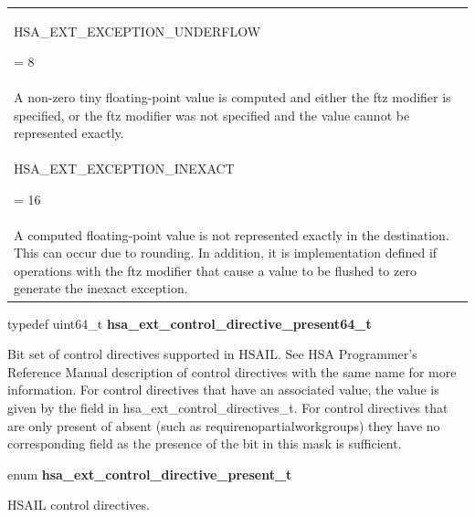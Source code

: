 \documentclass[final]{book}
\newcommand{\reftyp}[1]{#1}
\newcommand{\refenu}[1]{\reftyp{#1}}
\begin{document}
\begin{longtable}{@{\hspace{2em}}p{\linewidth-2em}}
\hspace{-2em}\hypertarget{group__FinalizerCoreApi_1ggaac4b20de831dd17c83c1e2110bac0ef2a15e11888d04953c37f86c8870807c888}{\refenu{HSA_EXT_EXCEPTION_UNDERFLOW}} = 8\\A non-zero tiny floating-point value is computed and either the ftz modifier is specified, or the ftz modifier was not specified and the value cannot be represented exactly.\\[2mm]
\hspace{-2em}\hypertarget{group__FinalizerCoreApi_1ggaac4b20de831dd17c83c1e2110bac0ef2ab0a718c671deb5e84e350199db22a24b}{\refenu{HSA_EXT_EXCEPTION_INEXACT}} = 16\\A computed floating-point value is not represented exactly in the destination. This can occur due to rounding. In addition, it is implementation defined if operations with the ftz modifier that cause a value to be flushed to zero generate the inexact exception.
\end{longtable}

\noindent\begin{tcolorbox}[nobeforeafter,arc=0mm,colframe=white,colback=lightgray,left=0mm]
typedef uint64_t  \hypertarget{group__FinalizerCoreApi_1ga366dea916dc7cec2954369e132e395e3}{\textbf{hsa_ext_control_directive_present64_t}}
\end{tcolorbox}
Bit set of control directives supported in HSAIL. See HSA Programmer's Reference Manual description of control directives with the same name for more information. For control directives that have an associated value, the value is given by the field in hsa_ext_control_directives_t. For control directives that are only present of absent (such as requirenopartialworkgroups) they have no corresponding field as the presence of the bit in this mask is sufficient.
\\

\noindent\begin{tcolorbox}[breakable,nobeforeafter,arc=0mm,colframe=white,colback=lightgray,left=0mm]
enum \hypertarget{group__FinalizerCoreApi_1ga143d9e622dfd7889d52fb5eb5ed1ffdb}{\textbf{hsa_ext_control_directive_present_t}}
\end{tcolorbox}
HSAIL control directives.
\end{document}
